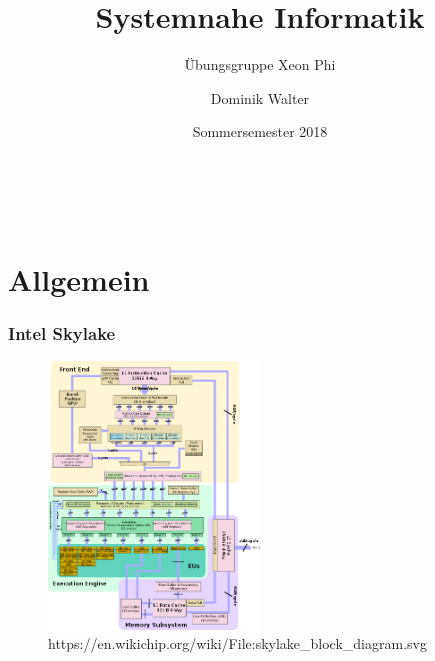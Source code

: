 \documentclass[xcolor=pdftex,dvipsnames,table]{beamer}
\title{Systemnahe Informatik}
\subtitle{Übungsgruppe Xeon Phi}
\author{Dominik Walter}
\date{Sommersemester 2018}
\begin{document}
\begin{frame}
	\frametitle{\ }
	\titlepage
\end{frame}
%
%		
%
%
%


\section{Allgemein}

\begin{frame}
	\frametitle{Intel Skylake}
	\begin{figure}
		\includegraphics[width=0.5\textwidth]{skylake.png}
		\caption{
			https://en.wikichip.org/wiki/File:skylake\_block\_diagram.svg}
	\end{figure}
\end{frame}
\end{document}
